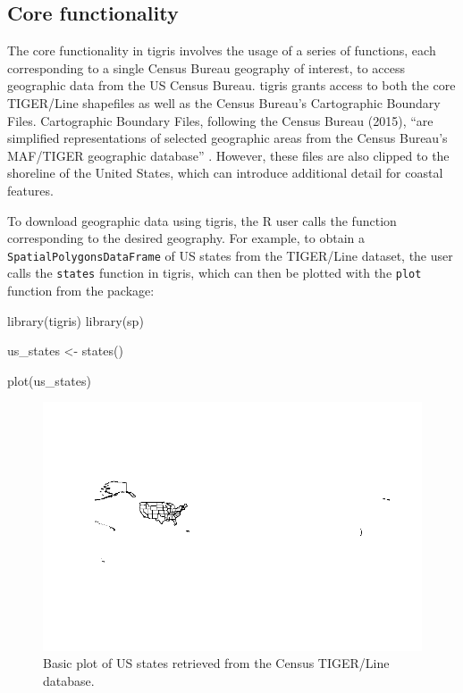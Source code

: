 \subsection{Core functionality}\label{core-functionality}

The core functionality in tigris involves the usage of a series of
functions, each corresponding to a single Census Bureau geography of
interest, to access geographic data from the US Census Bureau. tigris
grants access to both the core TIGER/Line shapefiles as well as the
Census Bureau's Cartographic Boundary Files. Cartographic Boundary
Files, following the Census Bureau (2015), ``are simplified
representations of selected geographic areas from the Census Bureau's
MAF/TIGER geographic database'' \citep{Census2015}. However, these files
are also clipped to the shoreline of the United States, which can
introduce additional detail for coastal features.

To download geographic data using tigris, the R user calls the function
corresponding to the desired geography. For example, to obtain a
\texttt{SpatialPolygonsDataFrame} of US states from the TIGER/Line
dataset, the user calls the \texttt{states} function in tigris, which
can then be plotted with the \texttt{plot} function from the
 package:

\begin{Schunk}
\begin{Sinput}
library(tigris)
library(sp)

us_states <- states()

plot(us_states)
\end{Sinput}
\end{Schunk}

\begin{figure}[htbp]
  \centering
  \includegraphics[width=\textwidth]{states}
  \caption{Basic plot of US states retrieved from the Census TIGER/Line database.}
  \label{figure:states}
\end{figure}

